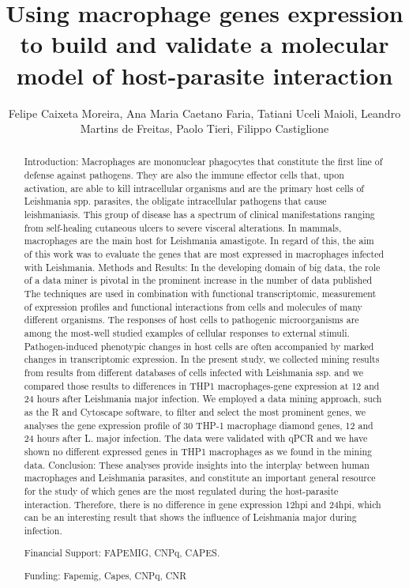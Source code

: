 \documentclass[twoside]{article}
\title{\vspace{-15mm}\fontsize{24pt}{10pt}\selectfont\textbf{ Using macrophage genes expression to build and validate a molecular model of host-parasite interaction }} %
\author{ Felipe Caixeta Moreira, Ana Maria Caetano Faria, Tatiani Uceli Maioli, Leandro Martins de Freitas, Paolo Tieri, Filippo Castiglione }
\affil{ Universidade Federal de Minas Gerais }
\date{}
\begin{document}
  
  
  \maketitle %
  
  
  \thispagestyle{fancy} %
  
  
  \begin{abstract}
  Introduction: Macrophages are mononuclear phagocytes that constitute the first line of defense against pathogens. They are also the immune effector cells that,  upon activation,  are able to kill intracellular organisms and are the primary host cells of Leishmania spp. parasites,  the obligate intracellular pathogens that cause leishmaniasis. This group of disease has a spectrum of clinical manifestations ranging from self-healing cutaneous ulcers to severe visceral alterations. In mammals,  macrophages are the main host for Leishmania amastigote. In regard of this,  the aim of this work was to evaluate the genes that are most expressed in macrophages infected with Leishmania.
Methods and Results: In the developing domain of big data,  the role of a data miner is pivotal in the prominent increase in the number of data published The techniques are used in combination with functional transcriptomic,  measurement of expression profiles and functional interactions from cells and molecules of many different organisms. The responses of host cells to pathogenic microorganisms are among the most-well studied examples of cellular responses to external stimuli. Pathogen-induced phenotypic changes in host cells are often accompanied by marked changes in transcriptomic expression. In the present study,  we collected mining results from results from different databases of cells infected with Leishmania ssp. and we compared those results to differences in THP1 macrophages-gene expression at 12 and 24 hours after Leishmania major infection. We employed a data mining approach,  such as the R and Cytoscape software,  to filter and select the most prominent genes,  we analyses the gene expression profile of 30 THP-1 macrophage diamond genes,  12 and 24 hours after L. major infection. The data were validated with qPCR and we have shown no different expressed genes in THP1 macrophages as we found in the mining data. 
Conclusion: These analyses provide insights into the interplay between human macrophages and Leishmania parasites,  and constitute an important general resource for the study of which genes are the most regulated during the host-parasite interaction. Therefore,  there is no difference in gene expression 12hpi and 24hpi,  which can be an interesting result that shows the influence of Leishmania major during infection.

Financial Support: FAPEMIG,  CNPq,  CAPES.
  
  Funding: Fapemig,  Capes,  CNPq,  CNR \\ 
  \end{abstract}
  
\end{document}
